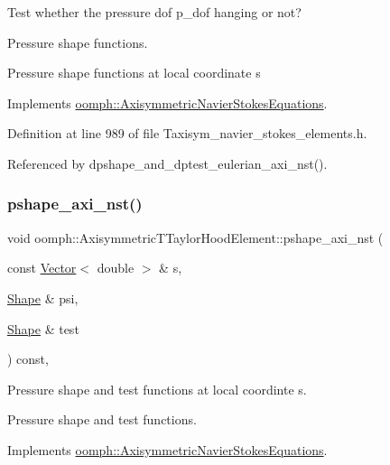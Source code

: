Test whether the pressure dof p\+\_\+dof hanging or not? 

Pressure shape functions.

Pressure shape functions at local coordinate s 

Implements \hyperlink{classoomph_1_1AxisymmetricNavierStokesEquations_a6309780fd1964c4df0cca0818ccff158}{oomph\+::\+Axisymmetric\+Navier\+Stokes\+Equations}.



Definition at line 989 of file Taxisym\+\_\+navier\+\_\+stokes\+\_\+elements.\+h.



Referenced by dpshape\+\_\+and\+\_\+dptest\+\_\+eulerian\+\_\+axi\+\_\+nst().

\mbox{\label{classoomph_1_1AxisymmetricTTaylorHoodElement_acaeacbb982949d5f9c6b3afec8b98de9}} 
\subsubsection{\texorpdfstring{pshape\+\_\+axi\+\_\+nst()}{pshape\_axi\_nst()}\hspace{0.1cm}{\footnotesize\ttfamily [2/2]}}
{\footnotesize\ttfamily void oomph\+::\+Axisymmetric\+T\+Taylor\+Hood\+Element\+::pshape\+\_\+axi\+\_\+nst (\begin{DoxyParamCaption}\item[{const \hyperlink{classoomph_1_1Vector}{Vector}$<$ double $>$ \&}]{s,  }\item[{\hyperlink{classoomph_1_1Shape}{Shape} \&}]{psi,  }\item[{\hyperlink{classoomph_1_1Shape}{Shape} \&}]{test }\end{DoxyParamCaption}) const\hspace{0.3cm}{\ttfamily [inline]}, {\ttfamily [virtual]}}



Pressure shape and test functions at local coordinte s. 

Pressure shape and test functions. 

Implements \hyperlink{classoomph_1_1AxisymmetricNavierStokesEquations_a19a4135581356bf368a7ecae2b315f85}{oomph\+::\+Axisymmetric\+Navier\+Stokes\+Equations}.



